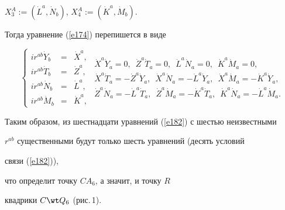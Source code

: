 $X^A_3:=(\Dot L^a,\Dot N_b)$, $X^A_4:=(\Dot K^a,\Dot M_b)$.


Тогда уравнение (\ref{e174}) перепишется в виде


\begin{equation}


\label{e182}%


\left\{


\begin{array}{lcl}


ir^{ab}\Dot Y_b & = & \Dot X^a, \\


ir^{ab}\Dot T_b & = & \Dot Z^a, \\


ir^{ab}\Dot N_b & = & \Dot L^a, \\


ir^{ab}\Dot M_b & = & \Dot K^a,


\end{array}


\right.


\begin{array}{c}


\Dot X^a\Dot Y_a=0, \ \;


\Dot Z^a\Dot T_a=0, \ \;


\Dot L^a\Dot N_a=0, \ \;


\Dot K^a\Dot M_a=0, \\[2mm]


\Dot X^a\Dot T_a=-\Dot Z^a\Dot Y_a, \ \;


\Dot X^a\Dot N_a=-\Dot L^a\Dot Y_a, \ \;


\Dot X^a\Dot M_a=-\Dot K^a\Dot Y_a, \\[2mm]


\Dot Z^a\Dot N_a=-\Dot L^a\Dot T_a, \ \;


\Dot Z^a\Dot M_a=-\Dot K^a\Dot T_a, \ \;


\Dot K^a\Dot N_a=-\Dot L^a\Dot M_a.


\end{array}


\end{equation}


Таким образом, из шестнадцати уравнений (\ref{e182}) с шестью неизвестными


$r^{ab}$ существенными будут только шесть уравнений (десять условий


связи (\ref{e182})),


что определит точку $CA_6$, а значит, и точку $R$


квадрики $C\wt Q_6$ (рис.\,1).


